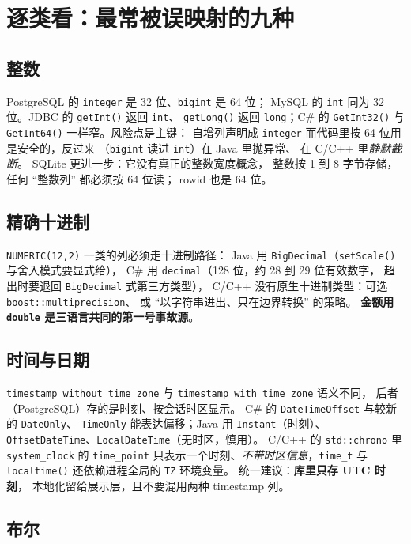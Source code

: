 \documentclass[12pt,a4paper,fontset=fandol]{ctexbook}
\newcommand{\Fn}[1]{\texttt{#1()}}
\newcommand{\Tp}[1]{\texttt{#1}}
\newcommand{\CSharp}{C\#}
\newcommand{\CppJava}{C/C++}
\begin{document}
\section{逐类看：最常被误映射的九种}

\subsection{整数}

PostgreSQL 的 \texttt{integer} 是 32 位、\texttt{bigint} 是 64 位；
MySQL 的 \texttt{int} 同为 32 位。JDBC 的 \Fn{getInt} 返回 \Tp{int}、
\Fn{getLong} 返回 \Tp{long}；\CSharp{} 的 \Fn{GetInt32} 与
\Fn{GetInt64} 一样窄。风险点是主键：
自增列声明成 \texttt{integer} 而代码里按 64 位用是安全的，反过来
（\texttt{bigint} 读进 \Tp{int}）在 Java 里抛异常、
在 \CppJava{} 里\emph{静默截断}。
SQLite 更进一步：它没有真正的整数宽度概念，
整数按 1 到 8 字节存储，任何 ``整数列'' 都必须按 64 位读；
rowid 也是 64 位。

\subsection{精确十进制}

\texttt{NUMERIC(12,2)} 一类的列必须走十进制路径：
Java 用 \Tp{BigDecimal}（\Fn{setScale} 与舍入模式要显式给），
\CSharp{} 用 \Tp{decimal}（128 位，约 28 到 29 位有效数字，
超出时要退回 \Tp{BigDecimal} 式第三方类型），
\CppJava{} 没有原生十进制类型：可选 \Tp{boost::\allowbreak multiprecision}、
或 ``以字符串进出、只在边界转换'' 的策略。
\textbf{金额用 \Tp{double} 是三语言共同的第一号事故源}。

\subsection{时间与日期}

\texttt{timestamp without time zone} 与
\texttt{timestamp with time zone} 语义不同，
后者（PostgreSQL）存的是时刻、按会话时区显示。
\CSharp{} 的 \Tp{DateTimeOffset} 与较新的 \Tp{DateOnly}、
\Tp{TimeOnly} 能表达偏移；Java 用 \Tp{Instant}（时刻）、
\Tp{OffsetDateTime}、\Tp{LocalDateTime}（无时区，慎用）。
\CppJava{} 的 \Tp{std::chrono} 里 \Tp{system\_clock} 的 
\Tp{time\_point} 只表示一个时刻、\emph{不带时区信息}，\Tp{time\_t}
与 \Fn{localtime} 还依赖进程全局的 \Tp{TZ} 环境变量。
统一建议：\textbf{库里只存 UTC 时刻}，
本地化留给展示层，且不要混用两种 timestamp 列。

\subsection{布尔}
\end{document}
